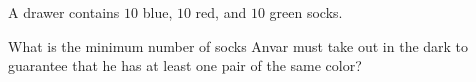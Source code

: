 A drawer contains $10$ blue, $10$ red, and $10$ green socks.



What is the minimum number of socks Anvar must take out in the dark to guarantee that he has at least one pair of the same color?
